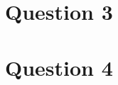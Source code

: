 \documentclass[12pt]{article}
\begin{document}
\section*{Question 3}

\section*{Question 4}
\end{document}
